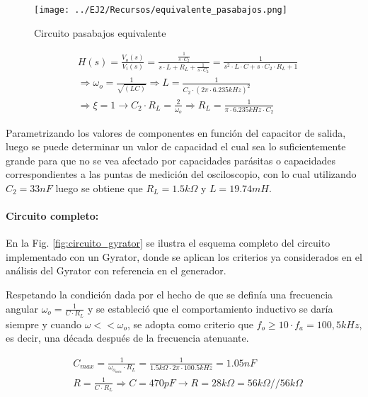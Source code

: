 \begin{figure}[H]
    \centering
    \texttt{[image: ../EJ2/Recursos/equivalente\_pasabajos.png]}
    \caption{Circuito pasabajos equivalente}
    \label{fig:equivalente_pasabajos}
\end{figure}

\begin{eqnarray*}
    & H(s) = \frac{V_o(s)}{V_i(s)} = \frac{ \frac{1}{s \cdot C_2} }{ s \cdot L + R_L + \frac{1}{s \cdot C_2}} = \frac{1}{s^{2} \cdot L \cdot C + s \cdot C_2 \cdot R_L + 1} \\
    & \Rightarrow \omega_o = \frac{1}{\sqrt{(LC)}} \Rightarrow L = \frac{1}{C_2 \cdot (2\pi \cdot 6.235kHz)^{2}} \\
    & \Rightarrow \xi = 1 \rightarrow C_2 \cdot R_L = \frac{2}{\omega_o} \Rightarrow R_L = \frac{1}{\pi \cdot 6.235kHz \cdot C_2}
\end{eqnarray*}

Parametrizando los valores de componentes en funci\'on del capacitor de salida, luego se puede determinar un valor de capacidad el cual sea lo suficientemente grande para que no se vea afectado
por capacidades par\'asitas o capacidades correspondientes a las puntas de medici\'on del osciloscopio, con lo cual utilizando $C_2 = 33nF$ luego se obtiene que $R_L = 1.5k \Omega$ y $L = 19.74mH$.

\paragraph*{Circuito completo:} En la Fig. \ref{fig:circuito_gyrator} se ilustra el esquema completo del circuito implementado con un Gyrator, donde se aplican los criterios ya considerados en el an\'alisis del Gyrator con referencia en el generador.

Respetando la condici\'on dada por el hecho de que se defin\'ia una frecuencia angular $\omega_o = \frac{1}{C \cdot R_L}$ y se estableci\'o que el comportamiento inductivo se dar\'ia siempre y cuando $\omega << \omega_o$,
se adopta como criterio que $f_o \geq 10 \cdot f_a = 100,5kHz$, es decir, una d\'ecada despu\'es de la frecuencia atenuante.

\begin{eqnarray}
    & C_{max} = \frac{1}{\omega_{o_{min}} \cdot R_L} = \frac{1}{1.5k \Omega \cdot 2\pi \cdot 100.5kHz} = 1.05nF\\
    & R = \frac{1}{C \cdot R_L} \Rightarrow C = 470pF \rightarrow R = 28k \Omega = 56k\Omega // 56k\Omega
\end{eqnarray}

